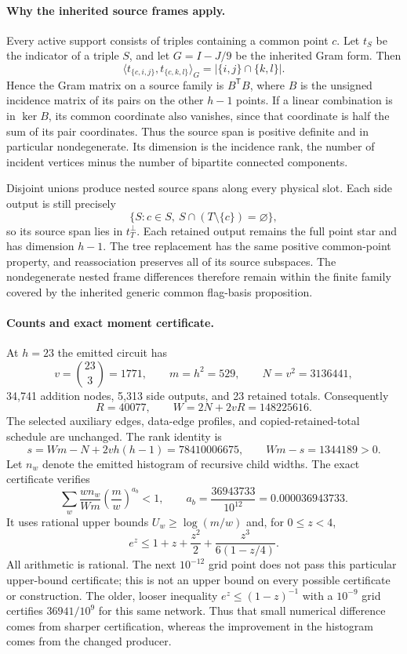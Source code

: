 \paragraph{Why the inherited source frames apply.}
Every active support consists of triples containing a common point $c$.
Let $t_S$ be the indicator of a triple $S$, and let $G=I-J/9$ be the inherited
Gram form. Then
\[
 \langle t_{\{c,i,j\}},t_{\{c,k,l\}}\rangle_G
 =|\{i,j\}\cap\{k,l\}|.
\]
Hence the Gram matrix on a source family is $B^{\mathsf T}B$, where $B$ is the
unsigned incidence matrix of its pairs on the other $h-1$ points. If a linear
combination is in $\ker B$, its common coordinate also vanishes, since that
coordinate is half the sum of its pair coordinates. Thus the source span is
positive definite and in particular nondegenerate. Its dimension is the
incidence rank, the number of incident vertices minus the number of bipartite
connected components.

Disjoint unions produce nested source spans along every physical slot. Each
side output is still precisely
\[
 \{S:c\in S,\ S\cap(T\setminus\{c\})=\varnothing\},
\]
so its source span lies in $t_T^\perp$. Each retained output remains the full
point star and has dimension $h-1$. The tree replacement has the same positive
common-point property, and reassociation preserves all of its source subspaces.
The nondegenerate nested frame differences therefore remain within the finite
family covered by the inherited generic common flag-basis proposition.

\paragraph{Counts and exact moment certificate.}
At $h=23$ the emitted circuit has
\[
 v=\binom{23}{3}=1771,\qquad m=h^2=529,\qquad N=v^2=3136441,
\]
34,741 addition nodes, 5,313 side outputs, and 23 retained totals. Consequently
\[
 R=40077,\qquad W=2N+2vR=148225616.
\]
The selected auxiliary edges, data-edge profiles, and copied-retained-total
schedule are unchanged. The rank identity is
\[
 s=Wm-N+2vh(h-1)=78410006675,
 \qquad Wm-s=1344189>0.
\]
Let $n_w$ denote the emitted histogram of recursive child widths. The exact
certificate verifies
\[
 \sum_w\frac{w n_w}{Wm}\left(\frac mw\right)^{a_b}<1,
 \qquad a_b=\frac{36943733}{10^{12}}=0.000036943733.
\]
It uses rational upper bounds $U_w\ge\log(m/w)$ and, for $0\le z<4$,
\[
 e^z\le 1+z+\frac{z^2}{2}+\frac{z^3}{6(1-z/4)}.
\]
All arithmetic is rational. The next $10^{-12}$ grid point does not pass this
particular upper-bound certificate; this is not an upper bound on every possible
certificate or construction. The older, looser inequality
$e^z\le(1-z)^{-1}$ with a $10^{-9}$ grid certifies $36941/10^9$ for this same
network. Thus that small numerical difference comes from sharper certification,
whereas the improvement in the histogram comes from the changed producer.

